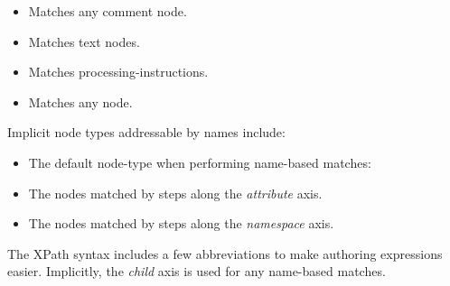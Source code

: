 \documentclass[20pt,landscape,headrule,footrule]{foils}
\begin{document}
\begin{minipage}{\textwidth}
\small
\begin{itemize}
    \item {} Matches any comment node.
    \item {} Matches text nodes.
    \item {} Matches processing-instructions.
    \item {} Matches any node.
\end{itemize}
\end{minipage}



Implicit node types addressable by names include:

\begin{minipage}{\textwidth}
\small
\begin{itemize}
    \item {} The default node-type when performing name-based matches:
    \item {} The nodes matched by steps along the
\emph{attribute} axis.
    \item {} The nodes matched by steps along the
\emph{namespace} axis.
\end{itemize}
\end{minipage}

 


The XPath syntax includes a few abbreviations to make authoring
expressions easier.  Implicitly, the \emph{child} axis is used
for any name-based matches.

\end{document}
